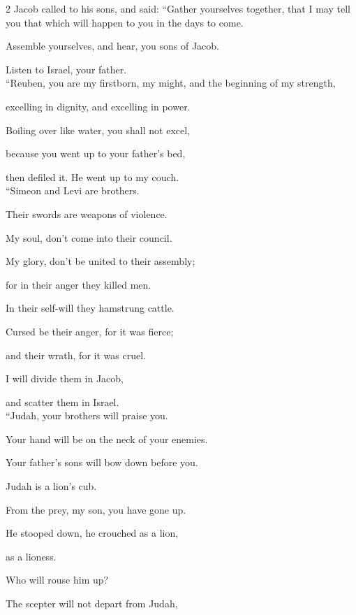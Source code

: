 \begin{multicols}{2}
	\mychapter{}
	\myverse*{}Jacob called to his sons, and said: “Gather yourselves together, that I may tell you that which will happen to you in the days to come.
	
	\myverse{}Assemble yourselves, and hear, you sons of Jacob.
	
	Listen to Israel, your father.
	\\
	
	\myverse{}“Reuben, you are my firstborn, my might, and the beginning of my strength,
	
	excelling in dignity, and excelling in power.
	
	\myverse{}Boiling over like water, you shall not excel,
	
	because you went up to your father’s bed,
	
	then defiled it. He went up to my couch.
	\\
	
	\myverse{}“Simeon and Levi are brothers.
	
	Their swords are weapons of violence.
	
	\myverse{}My soul, don’t come into their council.
	
	My glory, don’t be united to their assembly;
	
	for in their anger they killed men.
	
	In their self-will they hamstrung cattle.
	
	\myverse{}Cursed be their anger, for it was fierce;
	
	and their wrath, for it was cruel.
	
	I will divide them in Jacob,
	
	and scatter them in Israel.
	\\
	
	\myverse{}“Judah, your brothers will praise you.
	
	Your hand will be on the neck of your enemies.
	
	Your father’s sons will bow down before you.
	
	\myverse{}Judah is a lion’s cub.
	
	From the prey, my son, you have gone up.
	
	He stooped down, he crouched as a lion,
	
	as a lioness.
	
	Who will rouse him up?
	
	\myverse{}The scepter will not depart from Judah,
	

\end{multicols}

